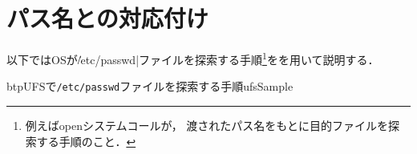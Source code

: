 \section{パス名と\inode の対応付け}

以下ではOSが\|/etc/passwd|ファイルを探索する手順\footnote{
  例えばopenシステムコールが，
  渡されたパス名をもとに目的ファイルを探索する手順のこと．
}をを用いて説明する．

\begin{myfig}{btp}{UFSで\texttt{/etc/passwd}ファイルを探索する手順}{ufsSample}
\end{myfig}

